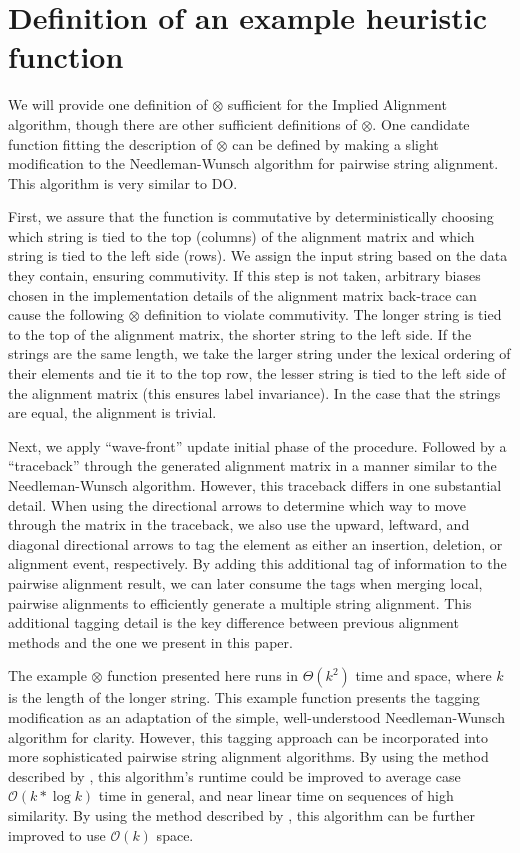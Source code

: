 \documentclass[11pt]{article}
\begin{document}
\section{Definition of an example heuristic function}
We will provide one definition of $\otimes$ sufficient for the Implied Alignment algorithm, though there are other sufficient definitions of $\otimes$.
One candidate function fitting the description of $\otimes$ can be defined by making a slight modification to the Needleman-Wunsch \citep{Needleman1970} algorithm for pairwise string alignment.
This algorithm is very similar to DO.

First, we assure that the function is commutative by deterministically choosing which string is tied to the top (columns) of the alignment matrix and which string is tied to the left side (rows).
We assign the input string based on the data they contain, ensuring commutivity.
If this step is not taken, arbitrary biases chosen in the implementation details of the alignment matrix back-trace can cause the following $\otimes$ definition to violate commutivity.
The longer string is tied to the top of the alignment matrix, the shorter string to the left side.
If the strings are the same length, we take the larger string under the lexical ordering of their elements and tie it to the top row, the lesser string is tied to the left side of the alignment matrix (this ensures label invariance). 
In the case that the strings are equal, the alignment is trivial.

Next, we apply ``wave-front'' update initial phase of the procedure.
Followed by a ``traceback'' through the generated alignment matrix in a manner similar to the Needleman-Wunsch algorithm.
However, this traceback differs in one substantial detail.
When using the directional arrows to determine which way to move through the matrix in the traceback, we also use the upward, leftward, and diagonal directional arrows to tag the element as either an insertion, deletion, or alignment event, respectively. 
By adding this additional tag of information to the pairwise alignment result, we can later consume the tags when merging local, pairwise alignments to efficiently generate a multiple string alignment.
This additional tagging detail is the key difference between previous alignment methods and the one we present in this paper.

The example $\otimes$ function presented here runs in $\Theta\left( k^2 \right)$ time and space, where $k$ is the length of the longer string.
This example function presents the tagging modification as an adaptation of the simple, well-understood Needleman-Wunsch algorithm for clarity.
However, this tagging approach can be incorporated into more sophisticated pairwise string alignment algorithms.
By using the method described by \cite{Ukkonen1985}, this algorithm's runtime could be improved to average case $\mathcal{O}\left( k * \log k \right)$ time in general, and near linear time on sequences of high similarity.
By using the method described by \cite{Hirschberg1975}, this algorithm can be further improved to use $\mathcal{O}\left( k \right)$ space.
\end{document}
